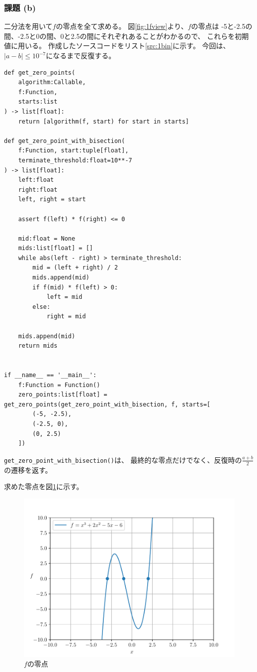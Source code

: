 \documentclass[a4j, titlepage]{jsarticle}
\numberwithin{equation}{section}
\begin{document}
        \subsubsection{課題 (b)}
            二分法を用いて$f$の零点を全て求める。
            図\ref{fig:1fview}より、$f$の零点は
            -5と-2.5の間、-2.5と0の間、0と2.5の間にそれぞれあることがわかるので、
            これらを初期値に用いる。
            作成したソースコードをリスト\ref{src:1bin}に示す。
            今回は、$|a-b|\leq 10^{-7}$になるまで反復する。

            \begin{lstlisting}[caption=二分法の実装, label=src:1bin]
def get_zero_points(
    algorithm:Callable,
    f:Function,
    starts:list
) -> list[float]:
    return [algorithm(f, start) for start in starts]

def get_zero_point_with_bisection(
    f:Function, start:tuple[float],
    terminate_threshold:float=10**-7
) -> list[float]:
    left:float
    right:float
    left, right = start
    
    assert f(left) * f(right) <= 0
    
    mid:float = None
    mids:list[float] = []
    while abs(left - right) > terminate_threshold:
        mid = (left + right) / 2
        mids.append(mid)
        if f(mid) * f(left) > 0:
            left = mid
        else:
            right = mid
            
    mids.append(mid)
    return mids


if __name__ == '__main__':
    f:Function = Function()
    zero_points:list[float] = get_zero_points(get_zero_point_with_bisection, f, starts=[
        (-5, -2.5),
        (-2.5, 0),
        (0, 2.5)
    ])
            \end{lstlisting}

            \verb|get_zero_point_with_bisection()|は、
            最終的な零点だけでなく、反復時の$\displaystyle\frac{a+b}{2}$の遷移を返す。

            求めた零点を図\ref{fig:1fzero}に示す。
            \begin{figure}[h]
                \centering
                \includegraphics[width=0.8\hsize]{kadai1/b.pdf}
                \caption{$f$の零点}
                \label{fig:1fzero}
            \end{figure}
\end{document}
